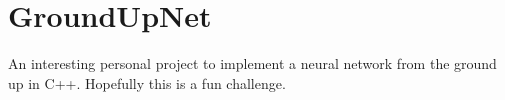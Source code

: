 \chapter{Ground\+Up\+Net}
\hypertarget{md__r_e_a_d_m_e}{}\label{md__r_e_a_d_m_e}
\label{md__r_e_a_d_m_e_autotoc_md0}%
%


An interesting personal project to implement a neural network from the ground up in C++. Hopefully this is a fun challenge. 